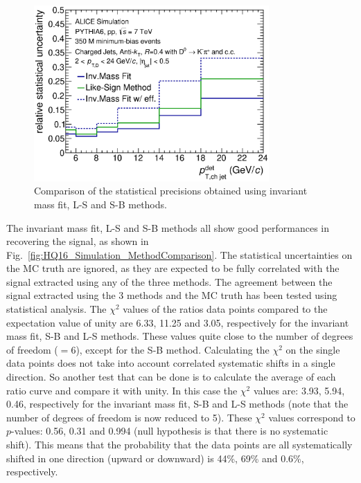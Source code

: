 \begin{figure}[tbh]
\begin{center}
\includegraphics[width=0.8\textwidth]{img/HQ16_Simulation_UncertaintyComparison}
 \caption{Comparison of the statistical precisions obtained using invariant mass fit, L-S and S-B methods.} 
 \label{fig:HQ16_Simulation_UncertaintyComparison}
\end{center}
\end{figure}
The invariant mass fit, L-S and S-B methods all show good performances in recovering the signal, as shown in Fig.~\ref{fig:HQ16_Simulation_MethodComparison}.
The statistical uncertainties on the MC truth are ignored, as they are expected to be fully correlated with the signal extracted using any of the three methods.
The agreement between the signal extracted using the 3 methods and the MC truth has been tested using statistical analysis. The $\chi^2$ values
of the ratios data points compared to the expectation value of unity are 6.33, 11.25 and 3.05, respectively for the invariant mass fit, S-B and L-S methods.
These values quite close to the number of degrees of freedom ($=6$), except for the S-B method.
Calculating the $\chi^2$ on the single data points does not take into account correlated systematic shifts in a single direction. So another test that can be
done is to calculate the average of each ratio curve and compare it with unity. In this case the $\chi^2$ values are: 3.93, 5.94, 0.46, respectively for the invariant mass fit,
S-B and L-S methods (note that the number of degrees of freedom is now reduced to 5). These $\chi^2$ values correspond to $p$-values: 0.56, 0.31 and 0.994 (null hypothesis is
that there is no systematic shift).
This means that the probability that the data points are all systematically shifted in one direction (upward or downward) is 44\%, 69\% and 0.6\%, respectively.
